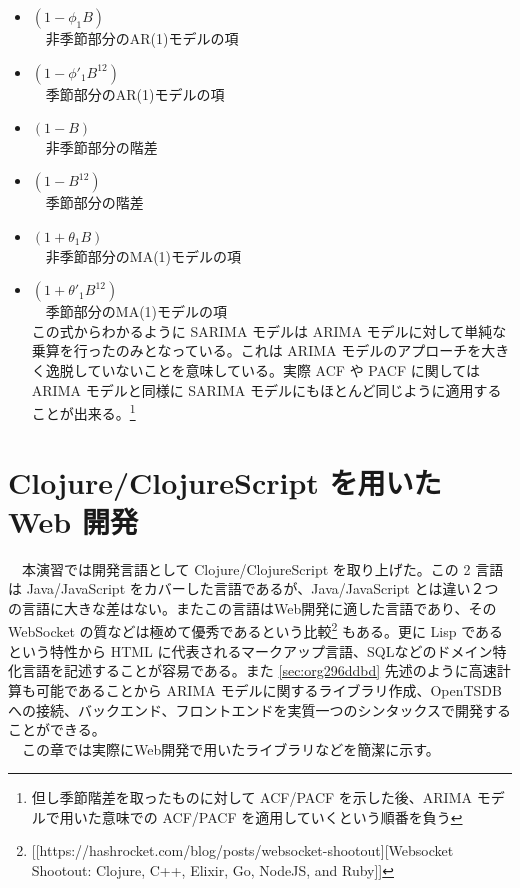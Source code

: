 \documentclass{scrartcl}
\begin{document}
\begin{itemize}
\item \((1-\phi_1 B)\) \\
　非季節部分のAR(1)モデルの項\\
\item \((1-\phi'_1B^{12})\)\\
　季節部分のAR(1)モデルの項\\
\item \((1-B)\)\\
　非季節部分の階差\\
\item \((1-B^{12})\)\\
　季節部分の階差\\
\item \((1+\theta_1B)\)\\
　非季節部分のMA(1)モデルの項\\
\item \((1+\theta'_1B^{12})\)\\
 　季節部分のMA(1)モデルの項\\
この式からわかるように SARIMA モデルは ARIMA モデルに対して単純な乗算を行ったのみとなっている。これは ARIMA モデルのアプローチを大きく逸脱していないことを意味している。実際 ACF や PACF に関しては ARIMA モデルと同様に SARIMA モデルにもほとんど同じように適用することが出来る。\footnote{但し季節階差を取ったものに対して ACF/PACF を示した後、ARIMA モデルで用いた意味での ACF/PACF を適用していくという順番を負う}\\
\end{itemize}
\section{Clojure/ClojureScript を用いた Web 開発}
\label{sec:org558e25f}
　本演習では開発言語として Clojure/ClojureScript を取り上げた。この 2 言語は Java/JavaScript をカバーした言語であるが、Java/JavaScript とは違い２つの言語に大きな差はない。またこの言語はWeb開発に適した言語であり、その WebSocket の質などは極めて優秀であるという比較\footnote{[[https://hashrocket.com/blog/posts/websocket-shootout][Websocket Shootout: Clojure, C++, Elixir, Go, NodeJS, and Ruby]]} もある。更に Lisp であるという特性から HTML に代表されるマークアップ言語、SQLなどのドメイン特化言語を記述することが容易である。また \ref{sec:org296ddbd} 先述のように高速計算も可能であることから ARIMA モデルに関するライブラリ作成、OpenTSDBへの接続、バックエンド、フロントエンドを実質一つのシンタックスで開発することができる。\\
　この章では実際にWeb開発で用いたライブラリなどを簡潔に示す。\\
\end{document}
